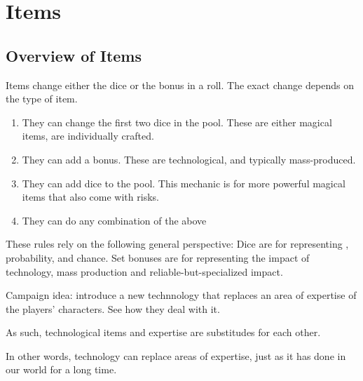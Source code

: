 \chapterspaceabove{6.75cm}
\chapterspacebelow{11.25cm}


\chapter*{Items}

\section*{Overview of Items}

Items change either the dice or the bonus in a roll.
The exact change depends on the type of item.

\begin{enumerate}
	\item They can change the first two dice in the pool. These are either magical items, are individually crafted.
	\item They can add a bonus. These are technological, and typically mass-produced.
	\item They can add dice to the pool. This mechanic is for more powerful magical items that also come with risks.
	\item They can do any combination of the above
\end{enumerate}


These rules rely on the following general perspective:
Dice are for representing , probability, and chance.
Set bonuses are for representing the impact of technology, mass production and reliable-but-specialized impact.
\begin{marginNote}
	Campaign idea: introduce a new technnology that replaces an area of expertise of the players' characters. See how they deal with it.
\end{marginNote}
As such, technological items and expertise are substitudes for each other.


\begin{emphasisParagraph}
	In other words, technology can replace areas of expertise, just as it has done in our world for a long time.
\end{emphasisParagraph}


